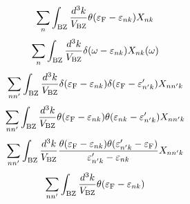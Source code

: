\documentclass[letterpaper,10pt,pdftex,openany,english]{sphinxmanual}
\begin{document}
\begin{equation*}
\begin{split}\begin{align}
\sum_{n}
\int_{\rm BZ} \frac{d^3 k}{V_{\rm BZ}}
\theta(\varepsilon_{\rm F} - \varepsilon_{n k})
X_{n k}
\end{align}\end{split}
\end{equation*}\begin{equation*}
\begin{split}\begin{align}
\sum_{n}
\int_{\rm BZ} \frac{d^3 k}{V_{\rm BZ}}
\delta(\omega - \varepsilon_{n k})
X_{n k}(\omega)
\end{align}\end{split}
\end{equation*}\begin{equation*}
\begin{split}\begin{align}
\sum_{n n'}
\int_{\rm BZ} \frac{d^3 k}{V_{\rm BZ}}
\delta(\varepsilon_{\rm F} - \varepsilon_{n k})
\delta(\varepsilon_{\rm F} - \varepsilon'_{n' k})
X_{n n' k}
\end{align}\end{split}
\end{equation*}\begin{equation*}
\begin{split}\begin{align}
\sum_{n n'}
\int_{\rm BZ} \frac{d^3 k}{V_{\rm BZ}}
\theta(\varepsilon_{\rm F} - \varepsilon_{n k})
\theta(\varepsilon_{n k} - \varepsilon'_{n' k})
X_{n n' k}
\end{align}\end{split}
\end{equation*}\begin{equation*}
\begin{split}\begin{align}
\sum_{n n'}
\int_{\rm BZ} \frac{d^3 k}{V_{\rm BZ}}
\frac{
\theta(\varepsilon_{\rm F} - \varepsilon_{n k})
\theta(\varepsilon'_{n' k} - \varepsilon_{\rm F})}
{\varepsilon'_{n' k} - \varepsilon_{n k}}
X_{n n' k}
\end{align}\end{split}
\end{equation*}\begin{equation*}
\begin{split}\begin{align}
\sum_{n n'}
\int_{\rm BZ} \frac{d^3 k}{V_{\rm BZ}}
\theta(\varepsilon_{\rm F} - \varepsilon_{n k})

\end{align}
\end{split}
\end{equation*}
\end{document}
